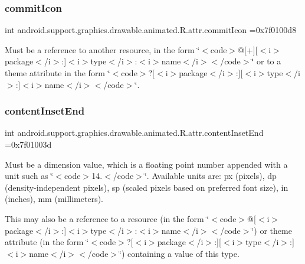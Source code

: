 \subsubsection{\texorpdfstring{commit\+Icon}{commitIcon}}
{\footnotesize\ttfamily int android.\+support.\+graphics.\+drawable.\+animated.\+R.\+attr.\+commit\+Icon =0x7f0100d8\hspace{0.3cm}{\ttfamily [static]}}

Must be a reference to another resource, in the form \char`\"{}$<$code$>$@\mbox{[}+\mbox{]}\mbox{[}$<$i$>$package$<$/i$>$\+:\mbox{]}$<$i$>$type$<$/i$>$\+:$<$i$>$name$<$/i$>$$<$/code$>$\char`\"{} or to a theme attribute in the form \char`\"{}$<$code$>$?\mbox{[}$<$i$>$package$<$/i$>$\+:\mbox{]}\mbox{[}$<$i$>$type$<$/i$>$\+:\mbox{]}$<$i$>$name$<$/i$>$$<$/code$>$\char`\"{}. \mbox{\label{classandroid_1_1support_1_1graphics_1_1drawable_1_1animated_1_1R_1_1attr_a788ca68eec8ddaf81ef1f80dfcb344d0}} 
\subsubsection{\texorpdfstring{content\+Inset\+End}{contentInsetEnd}}
{\footnotesize\ttfamily int android.\+support.\+graphics.\+drawable.\+animated.\+R.\+attr.\+content\+Inset\+End =0x7f01003d\hspace{0.3cm}{\ttfamily [static]}}

Must be a dimension value, which is a floating point number appended with a unit such as \char`\"{}$<$code$>$14.\+5sp$<$/code$>$\char`\"{}. Available units are\+: px (pixels), dp (density-\/independent pixels), sp (scaled pixels based on preferred font size), in (inches), mm (millimeters). 

This may also be a reference to a resource (in the form \char`\"{}$<$code$>$@\mbox{[}$<$i$>$package$<$/i$>$\+:\mbox{]}$<$i$>$type$<$/i$>$\+:$<$i$>$name$<$/i$>$$<$/code$>$\char`\"{}) or theme attribute (in the form \char`\"{}$<$code$>$?\mbox{[}$<$i$>$package$<$/i$>$\+:\mbox{]}\mbox{[}$<$i$>$type$<$/i$>$\+:\mbox{]}$<$i$>$name$<$/i$>$$<$/code$>$\char`\"{}) containing a value of this type. \mbox{\label{classandroid_1_1support_1_1graphics_1_1drawable_1_1animated_1_1R_1_1attr_adc40ac5c175076d1fcf1c31c13dc0563}} 

